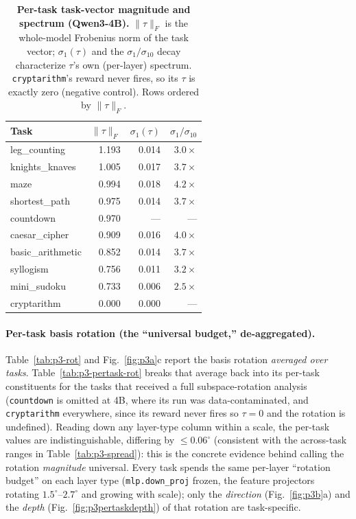 \documentclass{article}
\newcommand{\tv}{\tau}
\newcommand{\dg}{^{\circ}}
\begin{document}
\begin{table}[h]
\centering\small
\caption{\textbf{Per-task task-vector magnitude and spectrum (Qwen3-4B).} $\|\tv\|_F$ is the
whole-model Frobenius norm of the task vector; $\sigma_1(\tv)$ and the $\sigma_1/\sigma_{10}$ decay
characterize $\tv$'s own (per-layer) spectrum. \texttt{cryptarithm}'s reward never fires, so its
$\tv$ is exactly zero (negative control). Rows ordered by $\|\tv\|_F$.}
\label{tab:p3-taunorm}
\begin{tabular}{lrrr}
\toprule
Task & $\|\tv\|_F$ & $\sigma_1(\tv)$ & $\sigma_1/\sigma_{10}$\\
\midrule
leg\_counting    & 1.193 & 0.014 & $3.0\times$\\
knights\_knaves  & 1.005 & 0.017 & $3.7\times$\\
maze             & 0.994 & 0.018 & $4.2\times$\\
shortest\_path   & 0.975 & 0.014 & $3.7\times$\\
countdown        & 0.970 & ---   & ---\\
caesar\_cipher   & 0.909 & 0.016 & $4.0\times$\\
basic\_arithmetic& 0.852 & 0.014 & $3.7\times$\\
syllogism        & 0.756 & 0.011 & $3.2\times$\\
mini\_sudoku     & 0.733 & 0.006 & $2.5\times$\\
cryptarithm      & 0.000 & 0.000 & ---\\
\bottomrule
\end{tabular}
\end{table}

\paragraph{Per-task basis rotation (the ``universal budget,'' de-aggregated).}
Table~\ref{tab:p3-rot} and Fig.~\ref{fig:p3a}c report the basis rotation \emph{averaged over tasks}.
Table~\ref{tab:p3-pertask-rot} breaks that average back into its per-task constituents for the tasks
that received a full subspace-rotation analysis (\texttt{countdown} is omitted at 4B, where its run
was data-contaminated, and \texttt{cryptarithm} everywhere, since its reward never fires so $\tv=0$
and the rotation is undefined). Reading down any layer-type column within a scale, the per-task values
are indistinguishable, differing by $\leq0.06\dg$ (consistent with the across-task ranges in
Table~\ref{tab:p3-spread}): this is the concrete evidence behind calling the
rotation \emph{magnitude} universal. Every task spends the same per-layer ``rotation budget'' on each
layer type (\texttt{mlp.down\_proj} frozen, the feature projectors rotating $1.5\dg$--$2.7\dg$ and
growing with scale); only the \emph{direction} (Fig.~\ref{fig:p3b}a) and the \emph{depth}
(Fig.~\ref{fig:p3pertaskdepth}) of that rotation are task-specific.
\end{document}
